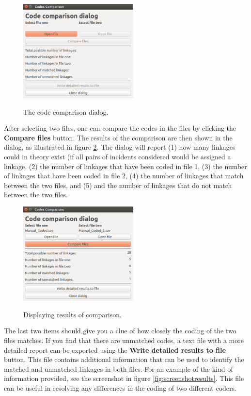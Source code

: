 \documentclass{memoir}
\begin{document}
\begin{figure}[h!]
  \centering
  \caption{The code comparison dialog.}
  \includegraphics[width=60mm]{Screenshot_13.pdf}
  \label{fig:codecomparisondialog}
\end{figure}

After selecting two files, one can compare the codes in the files by clicking the \textbf{Compare files} button. The results of the comparison are then shown in the dialog, as illustrated in figure \ref{fig:comparedcodes}. The dialog will report (1) how many linkages could in theory exist (if all pairs of incidents considered would be assigned a linkage, (2) the number of linkages that have been coded in file 1, (3) the number of linkages that have been coded in file 2, (4) the number of linkages that match between the two files, and (5) and the number of linkages that do not match between the two files.

\begin{figure}[h!]
  \centering
  \caption{Displaying results of comparison.}
  \includegraphics[width=60mm]{Screenshot_14.pdf}
  \label{fig:comparedcodes}
\end{figure}

The last two items should give you a clue of how closely the coding of the two files matches. If you find that there are unmatched codes, a text file with a more detailed report can be exported using the \textbf{Write detailed results to file} button. This file contains additional information that can be used to identify the matched and unmatched linkages in both files. For an example of the kind of information provided, see the screenshot in figure \ref{fig:screenshotresults}. This file can be useful in resolving any differences in the coding of two different coders. 
\end{document}
